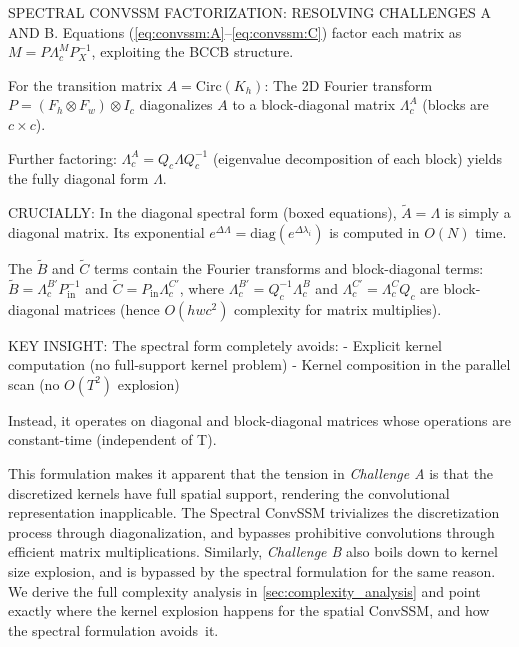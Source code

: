 \documentclass{article}
\begin{document}
\begin{thomasbox}
SPECTRAL CONVSSM FACTORIZATION: RESOLVING CHALLENGES A AND B. Equations (\ref{eq:convssm:A}--\ref{eq:convssm:C}) factor each matrix as $M = P \Lambda^M_c P_X^{-1}$, exploiting the BCCB structure.

For the transition matrix $A = \mathrm{Circ}(K_h)$: The 2D Fourier transform $P = (F_h \otimes F_w) \otimes I_c$ diagonalizes $A$ to a block-diagonal matrix $\Lambda^A_c$ (blocks are $c \times c$).

Further factoring: $\Lambda^A_c = Q_c \Lambda Q_c^{-1}$ (eigenvalue decomposition of each block) yields the fully diagonal form $\Lambda$.

CRUCIALLY: In the diagonal spectral form (boxed equations), $\widetilde{A} = \Lambda$ is simply a diagonal matrix. Its exponential $e^{\Delta \Lambda} = \mathrm{diag}(e^{\Delta \lambda_i})$ is computed in $O(N)$ time.

The $\widetilde{B}$ and $\widetilde{C}$ terms contain the Fourier transforms and block-diagonal terms: $\widetilde{B} = \Lambda^{B'}_c P_{\mathrm{in}}^{-1}$ and $\widetilde{C} = P_{\mathrm{in}} \Lambda^{C'}_c$, where $\Lambda^{B'}_c = Q_c^{-1} \Lambda^B_c$ and $\Lambda^{C'}_c = \Lambda^C_c Q_c$ are block-diagonal matrices (hence $O(hwc^2)$ complexity for matrix multiplies).

KEY INSIGHT: The spectral form completely avoids:
- Explicit kernel computation (no full-support kernel problem)
- Kernel composition in the parallel scan (no $O(T^2)$ explosion)

Instead, it operates on diagonal and block-diagonal matrices whose operations are constant-time (independent of T).
\end{thomasbox}

This formulation makes it apparent that the tension in \emph{Challenge A} is that the discretized kernels have full spatial support, rendering the convolutional representation inapplicable. The Spectral ConvSSM trivializes the discretization process through diagonalization, and bypasses prohibitive convolutions through efficient matrix multiplications.
%
Similarly, \emph{Challenge B} also boils down to kernel size explosion, and is bypassed by the spectral formulation for the same reason. We derive the full complexity analysis in \cref{sec:complexity_analysis} and point exactly where the kernel explosion happens for the spatial ConvSSM, and how the spectral formulation avoids~it.
\end{document}
